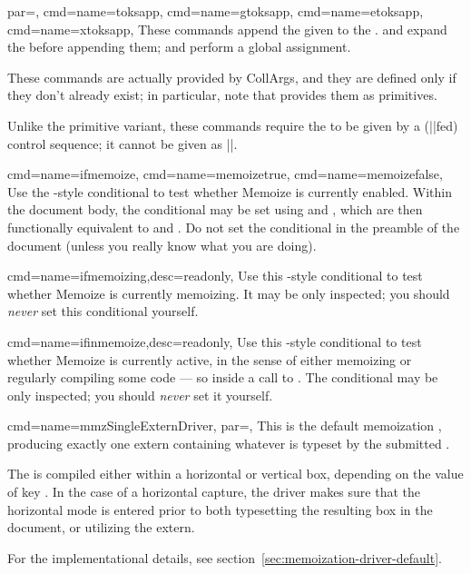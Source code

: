\documentclass[a4paper,11pt]{article}
\begin{document}
\begin{doc}{
    par=,
    cmd={name=toksapp},
    cmd={name=gtoksapp},
    cmd={name=etoksapp},
    cmd={name=xtoksapp},
  }
  These commands append the given  to the .
   and  expand the  before
  appending them;  and  perform a global
  assignment.

  These commands are actually provided by CollArgs, and they are defined only
  if they don't already exist; in particular, note that 
  provides them as primitives.

  Unlike the  primitive variant, these commands require the
   to be given by a (|\toksdef|fed) control sequence; it
  cannot be given as |\toks|.
\end{doc}

\begin{doc}{
    cmd={name=ifmemoize},
    cmd={name=memoizetrue},
    cmd={name=memoizefalse},
  }
  Use the -style conditional  to test whether
  Memoize is currently enabled.  Within the document body, the conditional may
  be set using  and , which are then
  functionally equivalent to  and .  Do not set
  the conditional in the preamble of the document (unless you really know what
  you are doing).
\end{doc}

\begin{doc}{
    cmd={name=ifmemoizing,desc={readonly}},
  }
  Use this -style conditional to test whether Memoize is currently
  memoizing.  It may be only inspected; you should \emph{never} set this
  conditional yourself.
\end{doc}

\begin{doc}{
    cmd={name=ifinmemoize,desc={readonly}},
  }
  Use this -style conditional to test whether Memoize is currently
  active, in the sense of either memoizing or regularly compiling some code ---
  so inside a call to .  The conditional may be only inspected;
  you should \emph{never} set it yourself.
\end{doc}

\begin{doc}{
    cmd={name=mmzSingleExternDriver, par=},
  }
  This is the default memoization , producing exactly one extern
  containing whatever is typeset by the submitted .

  The  is compiled either within a horizontal or vertical box,
  depending on the value of key .  In the case of a horizontal
  capture, the driver makes sure that the horizontal mode is entered prior to
  both typesetting the resulting box in the document, or utilizing the extern.

  For the implementational details, see
  section~\ref{sec:memoization-driver-default}.
\end{doc}
\end{document}
